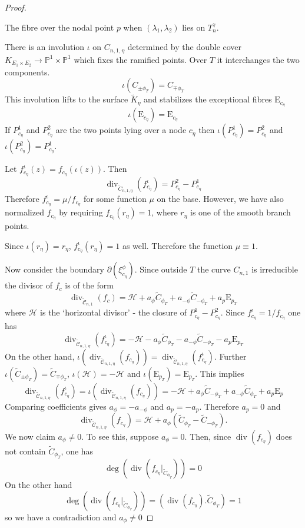 \documentclass[11pt,a4paper]{article}
\newcommand {\UH}{{\mathcal H}}
\newcommand {\CP}{{\mathds P}}
\newcommand {\RE}{{{\mathrm E}}}
\newcommand {\TCC}{\tilde{\mathcal C}}
\newcommand {\TK}{{\tilde{K}}}
\newcommand {\lb}{{\lambda}}
\newcommand {\KE}{{K_{E_1 \times E_2}}}
\newcommand {\CPP}{\CP^1 \times \CP^1}
\newcommand{\TC}{\tilde{C}}
\def\div{\operatorname{div}}
\def\deg{\operatorname{deg}}
\begin{document}
\begin{proof}
\begin{center}
\begin{tikzpicture}
	\end{tikzpicture}

The fibre over the nodal point $p$ when $(\lb_1,\lb_2)$ lies on $T_n^{\gamma}$.

\end{center}
	
There is an involution $\iota$ on $C_{n,1,\eta}$ determined by the double cover $\KE \longrightarrow \CPP$ which fixes the ramified points. Over $T$ it interchanges the two components. 
%
$$\iota(C_{\pm\phi_T})=C_{\mp\phi_T}$$
%
This involution lifts to the  surface $\TK_{\eta}$ and stabilizes the exceptional fibres $\RE_{c_{\eta}}$
%
$$ \iota(\RE_{c_{\eta}})=\RE_{c_{\eta}}$$
%
If $P^1_{c_{\eta}}$ and $P^2_{c_{\eta}}$ are the two points lying over a node $c_{\eta}$ then $\iota(P^1_{c_{\eta}})=P^2_{c_{\eta}}$ and $\iota(P^2_{c_{\eta}})=P^1_{c_{\eta}}$. 


Let $f^{\iota}_{c_{\eta}}(z)=f_{c_{\eta}}(\iota(z))$. Then 
%
$$\div_{\TC_{n,1,\eta}}(f^{\iota}_{c_{\eta}})=P^2_{c_{\eta}}-P^1_{c_{\eta}}$$
%
Therefore $f^{\iota}_{c_{\eta}}=\mu/f_{c_{\eta}}$ for some function $\mu$ on the base. However, we have also normalized $f_{c_{\eta}}$ by requiring  $f_{c_{\eta}}(r_{\eta})=1$, where $r_{\eta}$ is one of the smooth branch points.   

Since $\iota(r_{\eta})=r_{\eta}$, $f^{\iota}_{c_{\eta}}(r_{\eta})=1$ as well. Therefore the function $\mu \equiv 1$. 

Now consider the boundary $\partial(\xi^{\phi}_{c_{\eta}})$. Since outside $T$ the curve  $C_{n,1}$ is irreducible the divisor of $f_c$ is of the form 
$$	\div_{\TCC_{n,1}} (f_c)= \UH+a_{\phi} \TC_{\phi_T}+ a_{-\phi} \TC_{-\phi_T} +  a_p \RE_{p_T} $$ 
%
where $\UH$ is the `horizontal divisor' -  the closure of $P^1_{c_{\eta}}-P^2_{c_{\eta}}$. Since $f^{\iota}_{c_{\eta}}=1/f_{c_{\eta}}$ one has 
%
$$\div_{\TCC_{n,1,\eta}} (f^{\iota}_{c_{\eta}})= -\UH - a_{\phi} \TC_{\phi_T} - a_{-\phi} \TC_{-\phi_T} -  a_p \RE_{p_T}$$
On the other hand, $\iota(\div_{\TCC_{n,1,\eta}}(f_{c_{\eta}}))=\div_{\TCC_{n,1,\eta}}(f^{\iota}_{c_{\eta}})$. Further $\iota(\TC_{\pm \phi_T})=\TC_{\mp \phi_T}$, $\iota(\UH)=-\UH$ and $\iota(\RE_{p_T})=\RE_{p_T}$. This implies 
%
$$\div_{\TCC_{n,1,\eta}}(f^{\iota}_{c_{\eta}})=\iota(\div_{\TCC_{n,1,\eta}}(f_{c_{\eta}}))=-\UH+a_{\phi} \TC_{-\phi_T} + a_{-\phi} \TC_{\phi_T} + a_{p} \RE_{p}$$
%
Comparing coefficients gives $a_{\phi}=-a_{-\phi}$ and $a_p=-a_p$. Therefore $a_p=0$ and 
%
$$\div_{\TCC_{n,1,\eta}} (f_{c_{\eta}})= \UH+ a_{\phi}( \TC_{\phi_T} - \TC_{-\phi_T}).$$
%
We now claim $a_{\phi} \neq 0$. To see this, suppose $a_{\phi}=0$. Then, since $\div(f_{c_{\eta}})$ does not contain $\TC_{\phi_T}$, one has 
%
$$\deg(\div(f_{c_{\eta}}|_{\TC_{\phi_T}}))=0$$
%
On the other hand  
%
$$\deg(\div(f_{c_{\eta}}|_{\TC_{\phi_T}}))=(\div(f_{c_{\eta}}). \TC_{\phi_T})=1$$
%
so we have a contradiction and $a_{\phi} \neq 0$



\end{proof}
\end{document}

